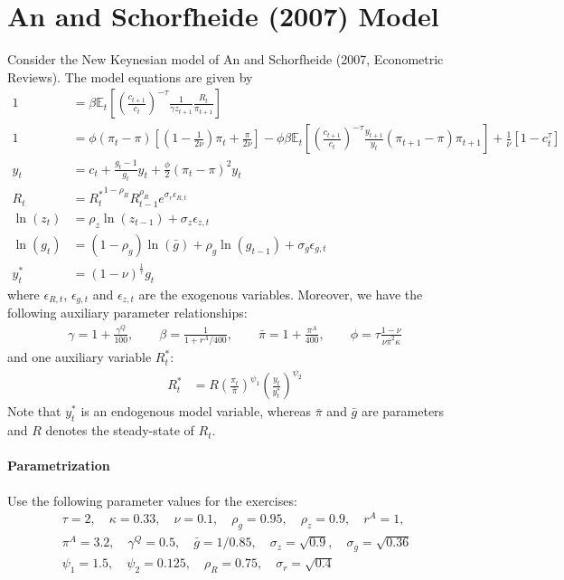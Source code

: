 \documentclass[a4paper]{scrartcl}
\begin{document}
\section[An and Schorfheide (2007) Model]{An and Schorfheide (2007) Model\label{ex:AnScho}}
Consider the New Keynesian model of An and Schorfheide (2007, Econometric Reviews).
The model equations are given by 
\begin{align}
1 &= \beta \mathbb{E}_t\left[{\left(\frac{c_{t+1}}{c_t}\right)}^{-\tau} \frac{1}{\gamma z_{t+1}} \frac{R_t}{\pi_{t+1}}\right] \label{eq:AS_B1}
\\
1 &= \phi \left(\pi_t - \pi\right) \left[\left(1-\frac{1}{2\nu}\right)\pi_t + \frac{\pi}{2\nu}\right] - \phi \beta \mathbb{E}_t \left[{\left(\frac{c_{t+1}}{c_t}\right)}^{-\tau} \frac{y_{t+1}}{y_t} \left(\pi_{t+1} - \pi \right) \pi_{t+1}\right] + \frac{1}{\nu}\left[1-c_t^{\tau}\right]
\\
y_t &= c_t + \frac{g_t-1}{g_t} y_t + \frac{\phi}{2} {\left({\pi_t - \pi}\right)}^2 y_t
\\
R_t &= {R_t^{*}}^{1-\rho_R} R_{t-1}^{\rho_R} e^{\sigma_r\epsilon_{R,t}}
\\
\ln(z_t) &= \rho_z \ln(z_{t-1}) + \sigma_z\epsilon_{z,t}
\\
\ln(g_t) &= (1-\rho_g)\ln(\bar{g}) + \rho_g \ln(g_{t-1}) + \sigma_g\epsilon_{g,t}
\\
y_t^* &= {(1-\nu)}^{\frac{1}{\tau}} g_t
\end{align}
where \(\epsilon_{R,t}\), \(\epsilon_{g,t}\) and \(\epsilon_{z,t}\) are the exogenous variables.
Moreover, we have the following auxiliary parameter relationships:
\begin{align*}
\gamma = 1+\frac{\gamma^{Q}}{100}, \qquad
\beta = \frac{1}{1+r^{A}/400}, \qquad
\bar{\pi} = 1+\frac{\pi^{A}}{400}, \qquad
\phi = \tau \frac{1-\nu}{\nu \bar{\pi}^{2}\kappa}
\end{align*}
and one auxiliary variable \(R_t^*\):
\begin{align*}
R_t^* &= R {\left(\frac{\pi_t}{\bar{\pi}}\right)}^{\psi_1} {\left(\frac{y_t}{y_t^*}\right)}^{\psi_2}
\end{align*}
Note that \(y_t^*\) is an endogenous model variable, whereas \(\bar{\pi}\) and \(\bar{g}\) are parameters and \(R\) denotes the steady-state of \(R_t\).

\paragraph{Parametrization}
Use the following parameter values for the exercises:
\begin{align*}
&\tau=2,\quad
\kappa=0.33,\quad
\nu=0.1,\quad
\rho_g=0.95,\quad
\rho_z=0.9,\quad	
r^{A}=1,\quad
\\
&\pi^{A}=3.2,\quad
\gamma^{Q}=0.5,\quad
\bar{g}=1/0.85,\quad
\sigma_z = \sqrt{0.9},\quad
\sigma_g=\sqrt{0.36}
\\
&\psi_1=1.5,\quad \psi_2=0.125,\quad \rho_R = 0.75,\quad \sigma_r = \sqrt{0.4}
\end{align*}
\end{document}
